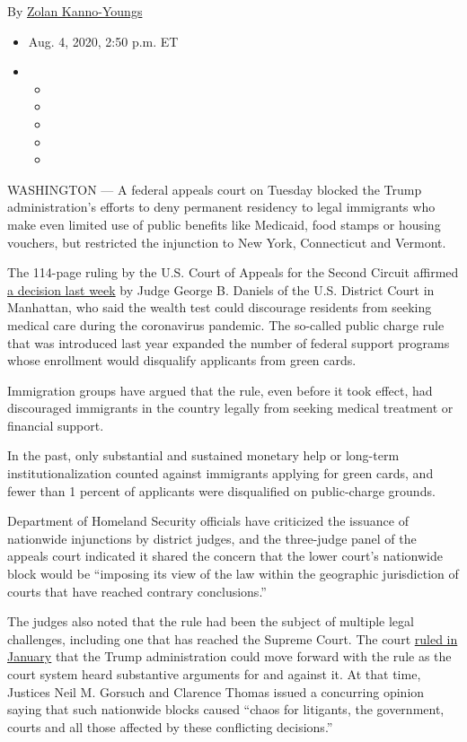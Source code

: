 By \href{https://www.nytimes3xbfgragh.onion/by/zolan-kanno-youngs}{Zolan
Kanno-Youngs}

\begin{itemize}
\item
  Aug. 4, 2020, 2:50 p.m. ET
\item
  \begin{itemize}
  \item
  \item
  \item
  \item
  \item
  \end{itemize}
\end{itemize}

WASHINGTON --- A federal appeals court on Tuesday blocked the Trump
administration's efforts to deny permanent residency to legal immigrants
who make even limited use of public benefits like Medicaid, food stamps
or housing vouchers, but restricted the injunction to New York,
Connecticut and Vermont.

The 114-page ruling by the U.S. Court of Appeals for the Second Circuit
affirmed
\href{https://www.nytimes3xbfgragh.onion/2020/07/30/us/trump-green-card.html}{a
decision last week} by Judge George B. Daniels of the U.S. District
Court in Manhattan, who said the wealth test could discourage residents
from seeking medical care during the coronavirus pandemic. The so-called
public charge rule that was introduced last year expanded the number of
federal support programs whose enrollment would disqualify applicants
from green cards.

Immigration groups have argued that the rule, even before it took
effect, had discouraged immigrants in the country legally from seeking
medical treatment or financial support.

In the past, only substantial and sustained monetary help or long-term
institutionalization counted against immigrants applying for green
cards, and fewer than 1 percent of applicants were disqualified on
public-charge grounds.

Department of Homeland Security officials have criticized the issuance
of nationwide injunctions by district judges, and the three-judge panel
of the appeals court indicated it shared the concern that the lower
court's nationwide block would be ``imposing its view of the law within
the geographic jurisdiction of courts that have reached contrary
conclusions.''

The judges also noted that the rule had been the subject of multiple
legal challenges, including one that has reached the Supreme Court. The
court
\href{https://www.nytimes3xbfgragh.onion/2020/01/27/us/supreme-court-trump-green-cards.html}{ruled
in January} that the Trump administration could move forward with the
rule as the court system heard substantive arguments for and against it.
At that time, Justices Neil M. Gorsuch and Clarence Thomas issued a
concurring opinion saying that such nationwide blocks caused ``chaos for
litigants, the government, courts and all those affected by these
conflicting decisions.''

